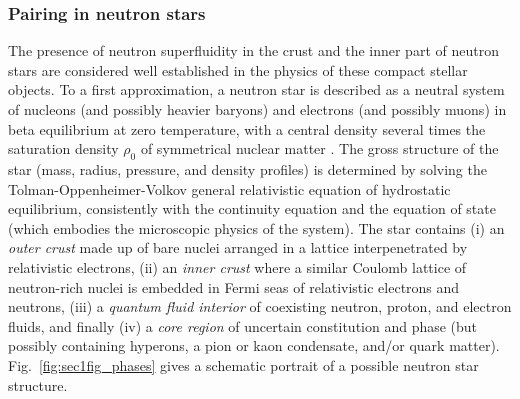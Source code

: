 \documentclass[preprint,rmp,aps,floatfix]{revtex4}
\begin{document}
\subsubsection{Pairing in neutron stars}
\label{subsubsect:neutron_stars}

The presence of neutron superfluidity in 
the crust and the inner part 
of neutron stars 
are considered well established 
in the physics of these compact stellar objects. 
To a first approximation, a neutron star 
is described as a neutral system of nucleons (and possibly heavier baryons) 
and electrons (and possibly muons) in beta equilibrium at zero temperature, 
with a central density several times the saturation density $\rho_0$ 
of symmetrical nuclear matter \cite{hh2000,pethick1992,shapiro,lamb,fiks,alparlives}. 
The gross structure of the star (mass, radius, pressure, and density 
profiles) is determined by solving the Tolman-Oppenheimer-Volkov general 
relativistic equation of hydrostatic equilibrium, consistently with 
the continuity equation and the equation of state (which embodies the 
microscopic physics of the system).  The star contains (i) an {\it outer 
crust} made up of bare nuclei arranged in a lattice interpenetrated 
by relativistic electrons, (ii) an {\it inner crust} where a similar 
Coulomb lattice of neutron-rich nuclei is embedded in Fermi seas of 
relativistic electrons and neutrons, (iii) a {\it quantum fluid interior} 
of coexisting neutron, proton, and electron fluids, and finally 
(iv) a {\it core region} of uncertain constitution and phase (but 
possibly containing hyperons, a pion or kaon condensate, and/or quark matter).
Fig.~\ref{fig:sec1fig_phases} gives a schematic portrait of a 
possible neutron star structure.
\end{document}
